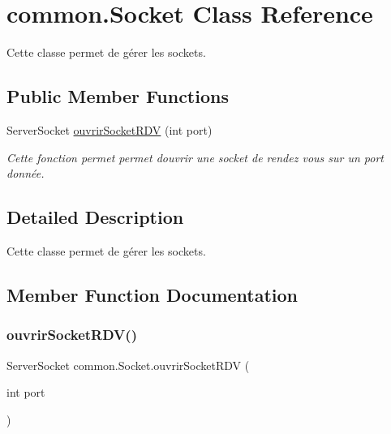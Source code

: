 \hypertarget{classcommon_1_1Socket}{}\section{common.\+Socket Class Reference}
\label{classcommon_1_1Socket}


Cette classe permet de gérer les sockets.  


\subsection*{Public Member Functions}
\begin{DoxyCompactItemize}
\item 
Server\+Socket \hyperlink{classcommon_1_1Socket_a921df60f921f6064dfc1b293bcf955cf}{ouvrir\+Socket\+R\+DV} (int port)
\begin{DoxyCompactList}\small\item\em Cette fonction permet permet d\textquotesingle{}ouvrir une socket de rendez vous sur un port donnée. \end{DoxyCompactList}\end{DoxyCompactItemize}


\subsection{Detailed Description}
Cette classe permet de gérer les sockets. 

\subsection{Member Function Documentation}
\mbox{\label{classcommon_1_1Socket_a921df60f921f6064dfc1b293bcf955cf}} 
\subsubsection{\texorpdfstring{ouvrir\+Socket\+R\+D\+V()}{ouvrirSocketRDV()}}
{\footnotesize\ttfamily Server\+Socket common.\+Socket.\+ouvrir\+Socket\+R\+DV (\begin{DoxyParamCaption}\item[{int}]{port }\end{DoxyParamCaption})\hspace{0.3cm}{\ttfamily [inline]}}




